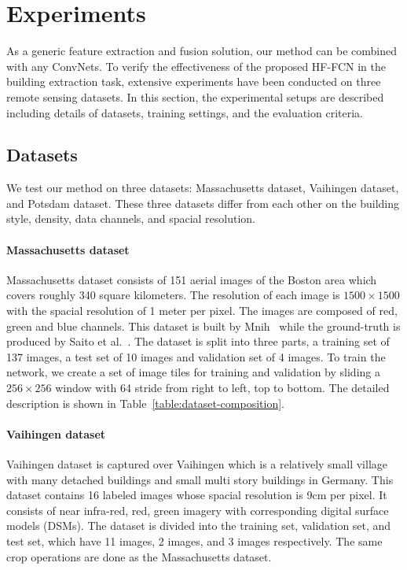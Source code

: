 \section{Experiments}
\label{Sec:exp}

As a generic feature extraction and fusion solution, our method can be combined with any ConvNets.
%
To verify the effectiveness of the proposed HF-FCN in the building extraction task, extensive experiments have been conducted on three remote sensing datasets.
%
In this section, the experimental setups are described including details of datasets, training settings, and the evaluation criteria.


\subsection{Datasets}
We test our method on three datasets: Massachusetts dataset, Vaihingen dataset, and Potsdam dataset.
These three datasets differ from each other on the building style, density, data channels, and spacial resolution.

\paragraph{Massachusetts dataset}
%
Massachusetts dataset consists of 151 aerial images of the Boston area which covers roughly 340 square kilometers.
The resolution of each image is $1500\times 1500$ with the spacial resolution of 1 meter per pixel.
The images are composed of red, green and blue channels.
This dataset is built by Mnih~\cite{IEEEexample:mnih2013machine} while the ground-truth is produced by Saito et al.~\cite{IEEEexample:saito2016multiple}.
%
The dataset is split into three parts, a training set of 137 images, a test set of 10 images and validation set of 4 images.
To train the network, we create a set of image tiles for training and validation by sliding a ${256\times256}$ window with 64 stride from right to left, top to bottom. The detailed description is shown in Table~\ref{table:dataset-composition}.

\paragraph{Vaihingen dataset}
%
Vaihingen dataset is captured over Vaihingen which is a relatively small village with many detached buildings and small multi story buildings in Germany.
This dataset contains 16 labeled images whose spacial resolution is 9cm per pixel.
It consists of near infra-red, red, green imagery with corresponding digital surface models (DSMs). The dataset is divided into the training set, validation set, and test set, which have 11 images, 2 images, and 3 images respectively.
%
The same crop operations are done as the Massachusetts dataset.

